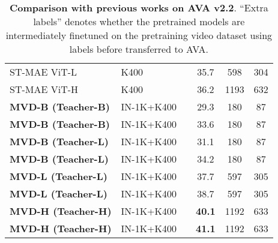 \documentclass[10pt,twocolumn,letterpaper]{article}
\makeatletter
\newcommand*{\system}{MVD\@\xspace}
\newcommand{\cmark}{\ding{51}}
\newcommand{\xmark}{\ding{55}}
\makeatother
\begin{document}
\begin{table}[t!]
{\begin{tabular}{l|l|c|c|c|c}
    ST-MAE {\scriptsize{ViT-L}}~\cite{feichtenhofer2022masked} & K400 & \cmark & 35.7 & 598 & 304 \\
    ST-MAE {\scriptsize{ViT-H}}~\cite{feichtenhofer2022masked} & K400 & \cmark & 36.2 & 1193 & 632 \\
    \hline
    \textbf{\system-B {\scriptsize{(Teacher-B)}}} & IN-1K+K400 & \xmark & 29.3 & 180 & 87 \\
    \textbf{\system-B {\scriptsize{(Teacher-B)}}} & IN-1K+K400 & \cmark & 33.6 & 180 & 87 \\
    \textbf{\system-B {\scriptsize{(Teacher-L)}}} & IN-1K+K400 & \xmark & 31.1 & 180 & 87 \\
    \textbf{\system-B {\scriptsize{(Teacher-L)}}} & IN-1K+K400 & \cmark & 34.2 & 180 & 87 \\
    \textbf{\system-L {\scriptsize{(Teacher-L)}}} & IN-1K+K400 & \xmark & 37.7 & 597 & 305 \\
    \textbf{\system-L {\scriptsize{(Teacher-L)}}} & IN-1K+K400 & \cmark & 38.7 & 597 & 305 \\
    \textbf{\system-H {\scriptsize{(Teacher-H)}}} & IN-1K+K400 & \xmark & \textbf{40.1} & 1192 & 633 \\
    \textbf{\system-H {\scriptsize{(Teacher-H)}}} & IN-1K+K400 & \cmark & \textbf{41.1} & 1192 & 633 \\
\end{tabular}
}
\caption{\textbf{Comparison with previous works on AVA v2.2}. ``Extra labels'' denotes whether the pretrained models are intermediately finetuned on the pretraining video dataset using labels before transferred to AVA. }
\label{tab:ava}
\vspace{-5pt}
\end{table}
\end{document}
